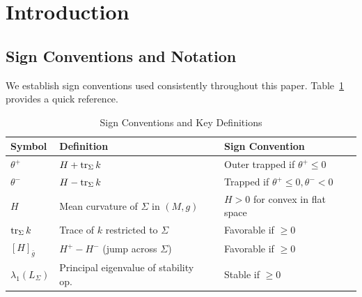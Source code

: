 \section{Introduction}\label{sec:intro}

\subsection{Sign Conventions and Notation}\label{subsec:Conventions}

We establish sign conventions used consistently throughout this paper. Table~\ref{tab:conventions} provides a quick reference.

\begin{table}[htbp]
\centering
\caption{Sign Conventions and Key Definitions}\label{tab:conventions}
\begin{tabular}{|l|l|l|}
\hline
\textbf{Symbol} & \textbf{Definition} & \textbf{Sign Convention} \\
\hline
$\theta^+$ & $H + \operatorname{tr}_\Sigma k$ & Outer trapped if $\theta^+ \le 0$ \\
$\theta^-$ & $H - \operatorname{tr}_\Sigma k$ & Trapped if $\theta^+ \le 0, \theta^- < 0$ \\
$H$ & Mean curvature of $\Sigma$ in $(M,g)$ & $H > 0$ for convex in flat space \\
$\operatorname{tr}_\Sigma k$ & Trace of $k$ restricted to $\Sigma$ & Favorable if $\ge 0$ \\
$[H]_{\bar{g}}$ & $H^+ - H^-$ (jump across $\Sigma$) & Favorable if $\ge 0$ \\
$\lambda_1(L_\Sigma)$ & Principal eigenvalue of stability op.\ & Stable if $\ge 0$ \\
\hline
\end{tabular}
\end{table}

